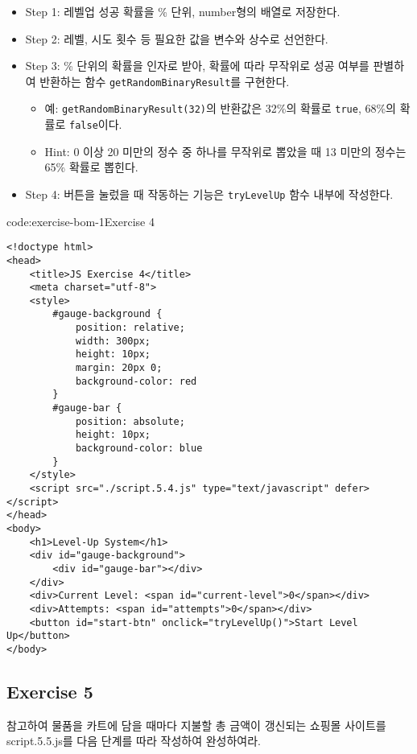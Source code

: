 \begin{itemize}
    \item Step 1: 레벨업 성공 확률을 \% 단위, number형의 배열로 저장한다.
    \item Step 2: 레벨, 시도 횟수 등 필요한 값을 변수와 상수로 선언한다.
    \item Step 3: \% 단위의 확률을 인자로 받아, 확률에 따라 무작위로 성공 여부를 판별하여 반환하는 함수 \texttt{getRandomBinaryResult}를 구현한다.
    \begin{itemize}
        \item 예: \texttt{getRandomBinaryResult(32)}의 반환값은 32\%의 확률로 \texttt{true}, 68\%의 확률로 \texttt{false}이다.
        \item Hint: 0 이상 20 미만의 정수 중 하나를 무작위로 뽑았을 때 13 미만의 정수는 65\% 확률로 뽑힌다.
    \end{itemize}
    \item Step 4: 버튼을 눌렀을 때 작동하는 기능은 \texttt{tryLevelUp} 함수 내부에 작성한다.
\end{itemize}

\begin{codeenv}{code:exercise-bom-1}{Exercise 4}\begin{verbatim}
<!doctype html>
<head>
    <title>JS Exercise 4</title>
    <meta charset="utf-8">
    <style>
        #gauge-background {
            position: relative;
            width: 300px;
            height: 10px;
            margin: 20px 0;
            background-color: red
        }
        #gauge-bar {
            position: absolute;
            height: 10px;
            background-color: blue
        }
    </style>
    <script src="./script.5.4.js" type="text/javascript" defer></script>
</head>
<body>
    <h1>Level-Up System</h1>
    <div id="gauge-background">
        <div id="gauge-bar"></div>
    </div>
    <div>Current Level: <span id="current-level">0</span></div>
    <div>Attempts: <span id="attempts">0</span></div>
    <button id="start-btn" onclick="tryLevelUp()">Start Level Up</button>
</body>
\end{verbatim}
\end{codeenv}

\subsection*{Exercise 5}

\을 참고하여 물품을 카트에 담을 때마다 지불할 총 금액이 갱신되는 쇼핑몰 사이트를 script.5.5.js를 다음 단계를 따라 작성하여 완성하여라.

